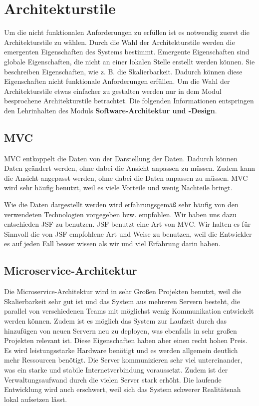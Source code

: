
\clearpage

\section{Architekturstile}
Um die nicht funktionalen Anforderungen zu erfüllen ist es notwendig zuerst die Architekturstile zu wählen. Durch die Wahl der Architekturstile werden die emergenten Eigenschaften des Systems bestimmt. Emergente Eigenschaften sind globale Eigenschaften, die nicht an einer lokalen Stelle erstellt werden können. Sie beschreiben Eigenschaften, wie z. B. die Skalierbarkeit. Dadurch können diese Eigenschaften nicht funktionale Anforderungen erfüllen. Um die Wahl der Architekturstile etwas einfacher zu gestalten werden nur in dem Modul besprochene Architekturstile betrachtet. Die folgenden Informationen entspringen den Lehrinhalten des Moduls \textbf{Software-Architektur und -Design}.

\vspace{18pt}

\subsection{MVC}
MVC entkoppelt die Daten von der Darstellung der Daten. Dadurch können Daten geändert werden, ohne dabei die Ansicht anpassen zu müssen. Zudem kann die Ansicht angepasst werden, ohne dabei die Daten anpassen zu müssen. MVC wird sehr häufig benutzt, weil es viele Vorteile und wenig Nachteile bringt.

\vspace{6pt}

Wie die Daten dargestellt werden wird erfahrungsgemäß sehr häufig von den verwendeten Technologien vorgegeben bzw. empfohlen. Wir haben uns dazu entschieden JSF zu benutzen. JSF benutzt eine Art von MVC. Wir halten es für Sinnvoll die von JSF empfohlene Art und Weise zu benutzen, weil die Entwickler es auf jeden Fall besser wissen als wir und viel Erfahrung darin haben.

\vspace{18pt}

\subsection{Microservice-Architektur}
Die Microservice-Architektur wird in sehr Großen Projekten benutzt, weil die Skalierbarkeit sehr gut ist und das System aus mehreren Servern besteht, die parallel von verschiedenen Teams mit möglichst wenig Kommunikation entwickelt werden können. Zudem ist es möglich das System zur Laufzeit durch das hinzufügen von neuen Servern neu zu deployen, was ebenfalls in sehr großen Projekten relevant ist. Diese Eigenschaften haben aber einen recht hohen Preis. Es wird leistungsstarke Hardware benötigt und es werden allgemein deutlich mehr Ressourcen benötigt. Die Server kommunizieren sehr viel untereinander, was ein starke und stabile Internetverbindung voraussetzt. Zudem ist der Verwaltungsaufwand durch die vielen Server stark erhöht. Die laufende Entwicklung wird auch erschwert, weil sich das System schwerer Realitätsnah lokal aufsetzen lässt. 

